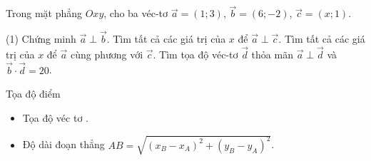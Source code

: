 \begin{vd}%
	Trong mặt phẳng $Oxy$, cho ba véc-tơ $\overrightarrow{a}=(1;3)$, $\overrightarrow{b}=(6;-2)$, $\overrightarrow{c}=(x;1)$.
	\begin{tasks}(1)
		\task Chứng minh $\overrightarrow{a}\perp \overrightarrow{b}$.
		\task Tìm tất cả các giá trị của $x$ để $\overrightarrow{a}\perp \overrightarrow{c}$.
		\task Tìm tất cả các giá trị của $x$ để $\overrightarrow{a}$ cùng phương với $\overrightarrow{c}$.
		\task Tìm tọa độ véc-tơ $\overrightarrow{d}$ thỏa mãn $\overrightarrow{a}\perp \overrightarrow{d}$ và $\overrightarrow{b}\cdot\overrightarrow{d}=20$.
	\end{tasks}
\end{vd}
\begin{dang}{Tọa độ điểm}
	\begin{itemize}
		\item [\ding{172}] Tọa độ véc tơ .
		\item [\ding{173}] Độ dài đoạn thẳng $\boxed{AB=\sqrt{(x_B-x_A)^2+(y_B-y_A)^2}}$.
	\end{itemize}
\end{dang}

